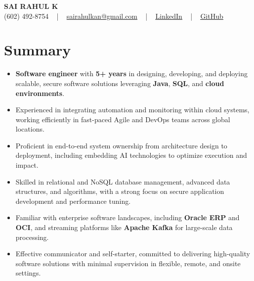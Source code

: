 \documentclass[letterpaper,11pt]{article}
\newcommand{\resumeItem}[1]{
  \item\footnotesize{
    {#1 \vspace{-2pt}}
  }
}
\newcommand{\resumeItemListStart}{\begin{itemize}[leftmargin=*]}
\newcommand{\resumeItemListEnd}{\end{itemize}\vspace{-5pt}}
\begin{document}
\begin{center}
    {\fontsize{14pt}{12pt}\selectfont \textbf{\MakeUppercase{Sai Rahul K}}}\\ \vspace{2pt}
    \fontsize{10pt}{12pt}\selectfont (602) 492-8754 ~ | ~ \href{mailto:sairahulkan@gmail.com}{sairahulkan@gmail.com} ~ | ~
    \href{https://www.linkedin.com/in/rq123/}{\color{blue}\underline{LinkedIn}} ~ | ~
    \href{https://github.com/kanrahuldo}{\color{blue}\underline{GitHub}}~
    \vspace{-8pt}
\end{center}

\section{Summary}
\fontsize{9pt}{10pt}\selectfont
\resumeItemListStart
    \resumeItem{\textbf{Software engineer} with \textbf{5+ years} in designing, developing, and deploying scalable, secure software solutions leveraging \textbf{Java}, \textbf{SQL}, and \textbf{cloud environments}.}
    \resumeItem{Experienced in integrating automation and monitoring within cloud systems, working efficiently in fast-paced Agile and DevOps teams across global locations.}
    \resumeItem{Proficient in end-to-end system ownership from architecture design to deployment, including embedding AI technologies to optimize execution and impact.}
    \resumeItem{Skilled in relational and NoSQL database management, advanced data structures, and algorithms, with a strong focus on secure application development and performance tuning.}
    \resumeItem{Familiar with enterprise software landscapes, including \textbf{Oracle ERP} and \textbf{OCI}, and streaming platforms like \textbf{Apache Kafka} for large-scale data processing.}
    \resumeItem{Effective communicator and self-starter, committed to delivering high-quality software solutions with minimal supervision in flexible, remote, and onsite settings.}
\resumeItemListEnd
\vspace{-6pt}
\end{document}
